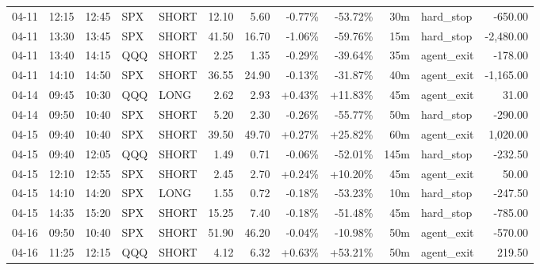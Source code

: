 \documentclass[11pt,a4paper,twoside]{article}
\begin{document}
\begin{center}
\begin{longtable}{>{\color{txtmain}}l l l l l r r r r r >{\color{txtmain}}l r}
04-11 & 12:15 & 12:45 & SPX & SHORT & 12.10 & 5.60 & \textcolor{lossred}{-0.77\%} & \textcolor{lossred}{-53.72\%} & 30m & hard\_stop & \textcolor{lossred}{-650.00} \\
04-11 & 13:30 & 13:45 & SPX & SHORT & 41.50 & 16.70 & \textcolor{lossred}{-1.06\%} & \textcolor{lossred}{-59.76\%} & 15m & hard\_stop & \textcolor{lossred}{-2,480.00} \\
04-11 & 13:40 & 14:15 & QQQ & SHORT & 2.25 & 1.35 & \textcolor{lossred}{-0.29\%} & \textcolor{lossred}{-39.64\%} & 35m & agent\_exit & \textcolor{lossred}{-178.00} \\
04-11 & 14:10 & 14:50 & SPX & SHORT & 36.55 & 24.90 & \textcolor{lossred}{-0.13\%} & \textcolor{lossred}{-31.87\%} & 40m & agent\_exit & \textcolor{lossred}{-1,165.00} \\
04-14 & 09:45 & 10:30 & QQQ & LONG & 2.62 & 2.93 & \textcolor{wingreen}{+0.43\%} & \textcolor{wingreen}{+11.83\%} & 45m & agent\_exit & \textcolor{wingreen}{31.00} \\
04-14 & 09:50 & 10:40 & SPX & SHORT & 5.20 & 2.30 & \textcolor{lossred}{-0.26\%} & \textcolor{lossred}{-55.77\%} & 50m & hard\_stop & \textcolor{lossred}{-290.00} \\
04-15 & 09:40 & 10:40 & SPX & SHORT & 39.50 & 49.70 & \textcolor{wingreen}{+0.27\%} & \textcolor{wingreen}{+25.82\%} & 60m & agent\_exit & \textcolor{wingreen}{1,020.00} \\
04-15 & 09:40 & 12:05 & QQQ & SHORT & 1.49 & 0.71 & \textcolor{lossred}{-0.06\%} & \textcolor{lossred}{-52.01\%} & 145m & hard\_stop & \textcolor{lossred}{-232.50} \\
04-15 & 12:10 & 12:55 & SPX & SHORT & 2.45 & 2.70 & \textcolor{wingreen}{+0.24\%} & \textcolor{wingreen}{+10.20\%} & 45m & agent\_exit & \textcolor{wingreen}{50.00} \\
04-15 & 14:10 & 14:20 & SPX & LONG & 1.55 & 0.72 & \textcolor{lossred}{-0.18\%} & \textcolor{lossred}{-53.23\%} & 10m & hard\_stop & \textcolor{lossred}{-247.50} \\
04-15 & 14:35 & 15:20 & SPX & SHORT & 15.25 & 7.40 & \textcolor{lossred}{-0.18\%} & \textcolor{lossred}{-51.48\%} & 45m & hard\_stop & \textcolor{lossred}{-785.00} \\
04-16 & 09:50 & 10:40 & SPX & SHORT & 51.90 & 46.20 & \textcolor{lossred}{-0.04\%} & \textcolor{lossred}{-10.98\%} & 50m & agent\_exit & \textcolor{lossred}{-570.00} \\
04-16 & 11:25 & 12:15 & QQQ & SHORT & 4.12 & 6.32 & \textcolor{wingreen}{+0.63\%} & \textcolor{wingreen}{+53.21\%} & 50m & agent\_exit & \textcolor{wingreen}{219.50} \\

\end{longtable}
\end{center}
\end{document}

